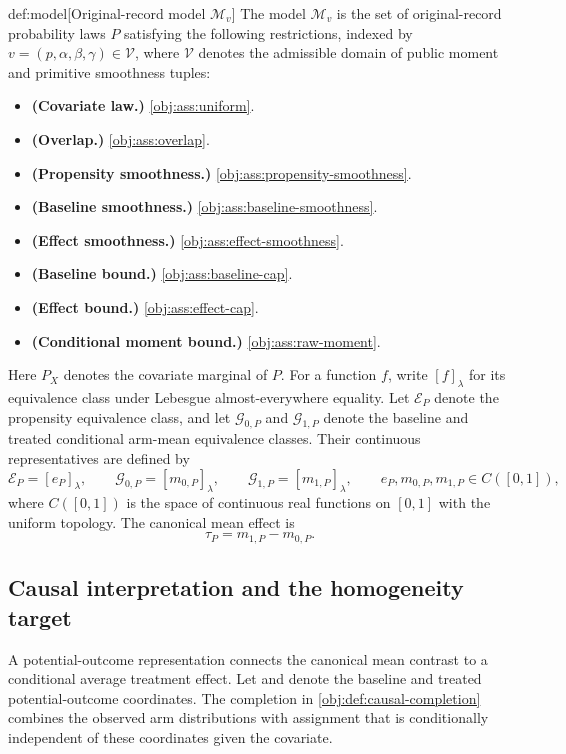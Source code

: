 \documentclass[11pt]{article}
\begin{document}
\begin{definitionv}{def:model}[Original-record model \(\mathcal M_v\)]
The model \(\mathcal M_v\) is the set of original-record probability laws \(P\) satisfying the following restrictions, indexed by \(v=(p,\alpha,\beta,\gamma)\in\mathcal V\), where \(\mathcal V\) denotes the admissible domain of public moment and primitive smoothness tuples:
\begin{itemize}
\item \textbf{(Covariate law.)} \cref{obj:ass:uniform}.
\item \textbf{(Overlap.)} \cref{obj:ass:overlap}.
\item \textbf{(Propensity smoothness.)} \cref{obj:ass:propensity-smoothness}.
\item \textbf{(Baseline smoothness.)} \cref{obj:ass:baseline-smoothness}.
\item \textbf{(Effect smoothness.)} \cref{obj:ass:effect-smoothness}.
\item \textbf{(Baseline bound.)} \cref{obj:ass:baseline-cap}.
\item \textbf{(Effect bound.)} \cref{obj:ass:effect-cap}.
\item \textbf{(Conditional moment bound.)} \cref{obj:ass:raw-moment}.
\end{itemize}
Here \(P_X\) denotes the covariate marginal of \(P\). For a function \(f\), write \([f]_\lambda\) for its equivalence class under Lebesgue almost-everywhere equality. Let \(\mathcal E_P\) denote the propensity equivalence class, and let \(\mathcal G_{0,P}\) and \(\mathcal G_{1,P}\) denote the baseline and treated conditional arm-mean equivalence classes. Their continuous representatives are defined by
\[
\mathcal E_P=[e_P]_\lambda,\qquad
\mathcal G_{0,P}=[m_{0,P}]_\lambda,\qquad
\mathcal G_{1,P}=[m_{1,P}]_\lambda,
\qquad
e_P,m_{0,P},m_{1,P}\in C([0,1]),
\]
where \(C([0,1])\) is the space of continuous real functions on \([0,1]\) with the uniform topology. The canonical mean effect is
\[
\tau_P=m_{1,P}-m_{0,P}.
\]
\end{definitionv}

\subsection{Causal interpretation and the homogeneity target}

A potential-outcome representation connects the canonical mean contrast to a conditional average treatment effect. Let  and  denote the baseline and treated potential-outcome coordinates. The completion  in \cref{obj:def:causal-completion} combines the observed arm distributions with assignment that is conditionally independent of these coordinates given the covariate.
\end{document}
